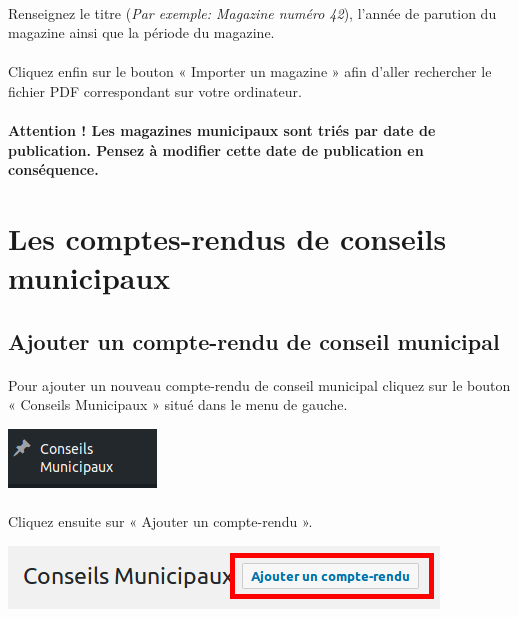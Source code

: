 \documentclass[10pt,a4paper]{article}
\begin{document}
\paragraph{}Renseignez le titre (\textit{Par exemple: Magazine numéro 42}), l'année de parution du magazine ainsi que la période du magazine.
\paragraph{}Cliquez enfin sur le bouton « Importer un magazine » afin d'aller rechercher le fichier PDF correspondant sur votre ordinateur.
\paragraph{Attention ! Les magazines municipaux sont triés par date de publication. Pensez à modifier cette date de publication en conséquence.}
\newpage

\section{Les comptes-rendus de conseils municipaux}
\subsection{Ajouter un compte-rendu de conseil municipal}
\paragraph{}Pour ajouter un nouveau compte-rendu de conseil municipal cliquez sur le bouton « Conseils Municipaux » situé dans le menu de gauche.
\begin{center}
\includegraphics[scale=0.3]{img/0325.png}
\end{center}
\paragraph{}Cliquez ensuite sur « Ajouter un compte-rendu ».
\begin{center}
\includegraphics[scale=0.3]{img/0326.png}
\end{center}
\end{document}
